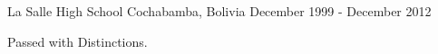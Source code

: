 \begin{cventries}
  {La Salle High School}
  {Cochabamba, Bolivia}
  {December 1999 - December 2012}
  {
    \begin{cvitems}
      \item{Passed with Distinctions.}
    \end{cvitems}
  }
\end{cventries}
